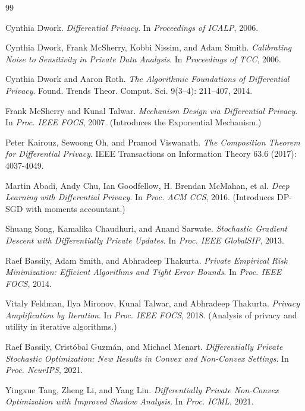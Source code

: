 \documentclass[11pt]{article}
\theoremstyle{remark}
\theoremstyle{definition}
\theoremstyle{plain}
\begin{document}
\newpage

\begin{thebibliography}{99}

 Cynthia Dwork. \textit{Differential Privacy}. In \textit{Proceedings of ICALP}, 2006.

 Cynthia Dwork, Frank McSherry, Kobbi Nissim, and Adam Smith. \textit{Calibrating Noise to Sensitivity in Private Data Analysis}. In \textit{Proceedings of TCC}, 2006.

 Cynthia Dwork and Aaron Roth. \textit{The Algorithmic Foundations of Differential Privacy}. Found. Trends Theor. Comput. Sci. 9(3–4): 211–407, 2014.

 Frank McSherry and Kunal Talwar. \textit{Mechanism Design via Differential Privacy}. In \textit{Proc. IEEE FOCS}, 2007. (Introduces the Exponential Mechanism.)

 Peter Kairouz, Sewoong Oh, and Pramod Viswanath. \textit{The Composition Theorem for Differential Privacy}. IEEE Transactions on Information Theory 63.6 (2017): 4037-4049.

 Martin Abadi, Andy Chu, Ian Goodfellow, H. Brendan McMahan, et al. \textit{Deep Learning with Differential Privacy}. In \textit{Proc. ACM CCS}, 2016. (Introduces DP-SGD with moments accountant.)

 Shuang Song, Kamalika Chaudhuri, and Anand Sarwate. \textit{Stochastic Gradient Descent with Differentially Private Updates}. In \textit{Proc. IEEE GlobalSIP}, 2013.

 Raef Bassily, Adam Smith, and Abhradeep Thakurta. \textit{Private Empirical Risk Minimization: Efficient Algorithms and Tight Error Bounds}. In \textit{Proc. IEEE FOCS}, 2014.

 Vitaly Feldman, Ilya Mironov, Kunal Talwar, and Abhradeep Thakurta. \textit{Privacy Amplification by Iteration}. In \textit{Proc. IEEE FOCS}, 2018. (Analysis of privacy and utility in iterative algorithms.)

 Raef Bassily, Crist\'{o}bal Guzm\'{a}n, and Michael Menart. \textit{Differentially Private Stochastic Optimization: New Results in Convex and Non-Convex Settings}. In \textit{Proc. NeurIPS}, 2021.

 Yingxue Tang, Zheng Li, and Yang Liu. \textit{Differentially Private Non-Convex Optimization with Improved Shadow Analysis}. In \textit{Proc. ICML}, 2021.


\end{thebibliography}
\end{document}
